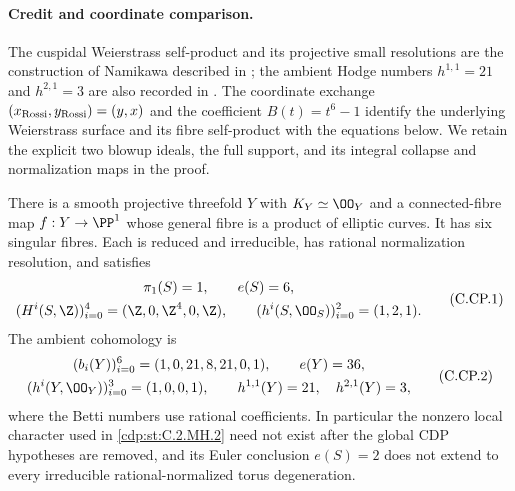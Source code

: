\paragraph{Credit and coordinate comparison.}
The cuspidal Weierstrass self-product and its projective small resolutions
are the construction of Namikawa described in
\cite[Proposition~4, pp.~10--11]{Rossi2017}; the ambient Hodge numbers
$h^{1,1}=21$ and $h^{2,1}=3$ are also recorded in
\cite[Remark~5, p.~20]{Rossi2017}.
The coordinate exchange $(x_{\rm Rossi},y_{\rm Rossi})=(y,x)$
and the coefficient $B(t)=t^6-1$ identify the underlying Weierstrass
surface and its fibre self-product with the equations below.
We retain the explicit two blowup ideals, the full support, and its
integral collapse and normalization maps in the proof.

\begin{proposition}\label{cdp:st:C.2.UN.8}
There is a smooth projective threefold $Y$ with $K_Y\simeq\OO_Y$
and a connected-fibre map $f:Y\to\PP^1$ whose general fibre is a
product of elliptic curves. It has six singular fibres. Each is
reduced and irreducible, has rational normalization resolution, and
satisfies
\[
 \begin{gathered}
 \pi_1(S)=1,\qquad e(S)=6,\\
 (H^i(S,\Z))_{i=0}^4=(\Z,0,\Z^4,0,\Z),\qquad
 (h^i(S,\OO_S))_{i=0}^2=(1,2,1).
 \end{gathered}
 \tag{C.CP.1}\label{cdp:eq:C.CP.1}
\]
The ambient cohomology is
\[
 \begin{gathered}
 (b_i(Y))_{i=0}^6=(1,0,21,8,21,0,1),\qquad e(Y)=36,\\
 (h^i(Y,\OO_Y))_{i=0}^3=(1,0,0,1),\qquad
 h^{1,1}(Y)=21,\quad h^{2,1}(Y)=3,
 \end{gathered}
 \tag{C.CP.2}\label{cdp:eq:C.CP.2}
\]
where the Betti numbers use rational coefficients. In particular
the nonzero local character used in \ref{cdp:st:C.2.MH.2} need not exist after
the global CDP hypotheses are removed, and its Euler conclusion
$e(S)=2$ does not extend to every irreducible rational-normalized
torus degeneration.
\end{proposition}

